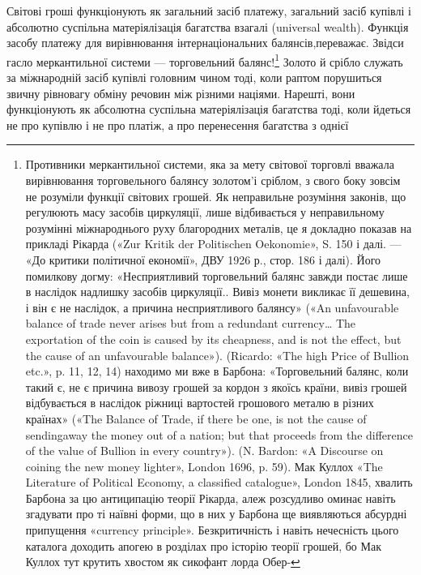 Світові гроші функціонують як загальний засіб платежу,
загальний засіб купівлі і абсолютно суспільна матеріялізація
багатства взагалі (universal wealth). Функція засобу платежу
для вирівнювання інтернаціональних балянсів,переважає. Звідси
гасло меркантильної системи — торговельний балянс!\footnote{
Противники меркантильної системи, яка за мету світової торговлі
вважала вирівнювання торговельного балянсу золотом'і сріблом, з свого
боку зовсім не розуміли функції світових грошей. Як неправильне розуміння
законів, що регулюють масу засобів циркуляції, лише відбивається
у неправильному розумінні міжнароднього руху благородних металів,
це я докладно показав на прикладі Рікарда («Zur Kritik der Politischen
Oekonomie», S. 150 і далі. — «До критики політичної економії», ДВУ
1926 р., стор. 186 і далі). Його помилкову догму: «Несприятливий торговельний
балянс завжди постає лише в наслідок надлишку засобів циркуляції..
Вивіз монети викликає її дешевина, і він є не наслідок, а причина
несприятливого балянсу» («An unfavourable balance of trade never
arises but from a redundant currency\dots{} The exportation of the coin is caused
by its cheapness, and is not the effect, but the cause of an unfavourable
balance»). (Ricardo: «The high Price of Bullion etc.», p. 11, 12, 14)
находимо ми вже в Барбона: «Торговельний балянс, коли такий є, не
є причина вивозу грошей за кордон з якоїсь країни, вивіз грошей відбувається
в наслідок ріжниці вартостей грошового металю в різних країнах»
(«The Balance of Trade, if there be one, is not the cause of sendingaway
the money out of a nation; but that proceeds from the difference of the value
of Bullion in every country»). (N. Bardon: «A Discourse on coining
the new money lighter», London 1696, p. 59). Мак Куллох «The Literature
of Political Economy, a classified catalogue», London 1845, хвалить
Барбона за цю антиципацію теорії Рікарда, алеж розсудливо оминає
навіть згадувати про ті наївні форми, що в них у Барбона ще виявляються
абсурдні припущення «currency principle». Безкритичність і навіть нечесність
цього каталога доходить апогею в розділах про історію теорії
грошей, бо Мак Куллох тут крутить хвостом як сикофант лорда Обер-
} Золото
й срібло служать за міжнародній засіб купівлі головним чином
тоді, коли раптом порушиться звичну рівновагу обміну речовин
між різними націями. Нарешті, вони функціонують як абсолютна
суспільна матеріялізація багатства тоді, коли йдеться не
про купівлю і не про платіж, а про перенесення багатства з однієї

